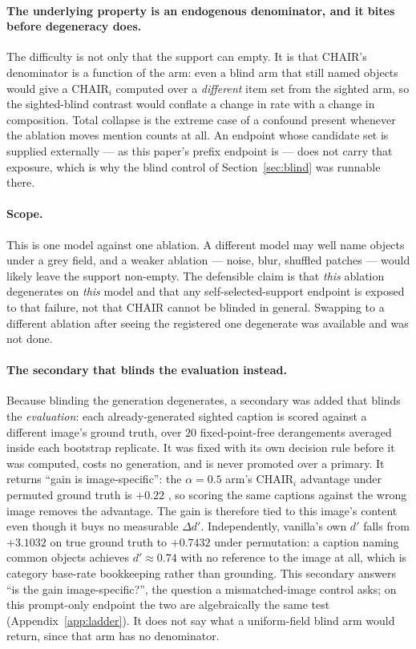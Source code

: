 \paragraph{The underlying property is an endogenous denominator, and it bites before degeneracy
does.} The difficulty is not only that the support can empty. It is that CHAIR's denominator is a
function of the arm: even a blind arm that still named objects would give a $\mathrm{CHAIR}_i$
computed over a \emph{different} item set from the sighted arm, so the sighted-blind contrast would
conflate a change in rate with a change in composition. Total collapse is the extreme case of a
confound present whenever the ablation moves mention counts at all. An endpoint whose candidate set
is supplied externally --- as this paper's prefix endpoint is --- does not carry that exposure, which
is why the blind control of Section~\ref{sec:blind} was runnable there.

\paragraph{Scope.} This is one model against one ablation. A different model may well name objects
under a grey field, and a weaker ablation --- noise, blur, shuffled patches --- would likely leave
the support non-empty. The defensible claim is that \emph{this} ablation degenerates on \emph{this}
model and that any self-selected-support endpoint is exposed to that failure, not that CHAIR cannot
be blinded in general. Swapping to a different ablation after seeing the registered one degenerate
was available and was not done.

\paragraph{The secondary that blinds the evaluation instead.} Because
blinding the generation degenerates, a secondary was added that blinds the \emph{evaluation}: each
already-generated sighted caption is scored against a different image's ground truth, over $20$
fixed-point-free derangements averaged inside each bootstrap replicate. It was fixed with its own
decision rule before it was computed, costs no generation, and is never promoted over a primary. It
returns ``gain is image-specific'': the $\alpha = 0.5$ arm's $\mathrm{CHAIR}_i$ advantage under
permuted ground truth is $+0.22$ , so scoring the same captions against the wrong
image removes the advantage. The gain is therefore tied to this image's content even though it buys
no measurable $\Delta d'$. Independently, vanilla's own $d'$ falls from $+3.1032$ on true ground
truth to $+0.7432$ under permutation: a caption naming common objects achieves $d' \approx 0.74$
with no reference to the image at all, which is category base-rate bookkeeping rather than
grounding. This secondary answers ``is the gain image-specific?'', the question a mismatched-image control
asks; on this prompt-only endpoint the two are algebraically the same test
(Appendix~\ref{app:ladder}). It does not say what a uniform-field blind arm would return, since that
arm has no denominator.

